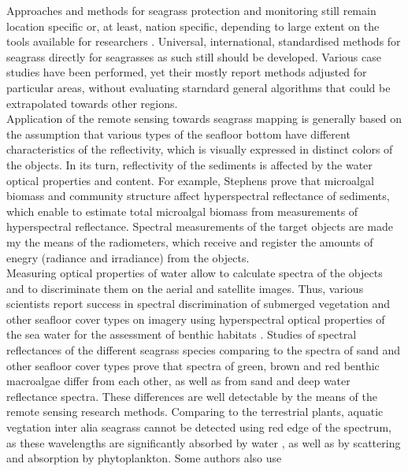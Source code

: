 \documentclass[10pt, a4paper]{article}
\begin{document}
Approaches and methods for seagrass protection and monitoring still remain location specific or, at
least, nation specific, depending to large extent on the tools available for researchers \cite{Mellors09a} \label{Mellors09a}.
Universal, international, standardised methods for seagrass directly for seagrasses
as such still should be developed. Various case studies have been performed, yet their mostly report
methods adjusted for particular areas, without evaluating starndard general algorithms that could be
extrapolated towards other regions. \\ Application of the remote sensing towards seagrass mapping is
generally based on the assumption that various types of the seafloor bottom have different
characteristics of the reflectivity, which is visually expressed in distinct colors of the objects. In its
turn, reflectivity of the sediments is affected by the water optical properties and content. For
example, Stephens \cite{Stephens03}\label{Stephens03} prove that microalgal biomass and community structure affect
hyperspectral reflectance of sediments, which enable to estimate total microalgal biomass from
measurements of hyperspectral reflectance. Spectral measurements of the target objects are made
my the means of the radiometers, which receive and register the amounts of enegry (radiance and
irradiance) from the objects. \\ Measuring optical properties of water allow to calculate spectra of the
objects and to discriminate them on the aerial and satellite images. Thus, various scientists report
success in spectral discrimination of submerged vegetation and other seafloor cover types on imagery
using hyperspectral optical properties of the sea water for the assessment of benthic habitats \cite{Lewis01,Louchard03,Dehouck08,Werdell03}\label{Lewis01} \label{Louchard03} \label{Dehouck08} \label{Werdell03}.
Studies of spectral reflectances of the different seagrass species comparing to the spectra of sand and
other seafloor cover types \cite{Vahtmae06}\label{Vahtmae06} prove that spectra of green, brown and red benthic
macroalgae differ from each other, as well as from sand and deep water reflectance spectra. These
differences are well detectable by the means of the remote sensing research methods. Comparing to
the terrestrial plants, aquatic vegtation inter alia seagrass cannot be detected using red edge of the
spectrum, as these wavelengths are significantly absorbed by water \cite{Kirk94}\label{Kirk94}, as well as by
scattering and absorption by phytoplankton. Some authors \cite{Dierssen03}\label{Dierssen03} also use
\end{document}
